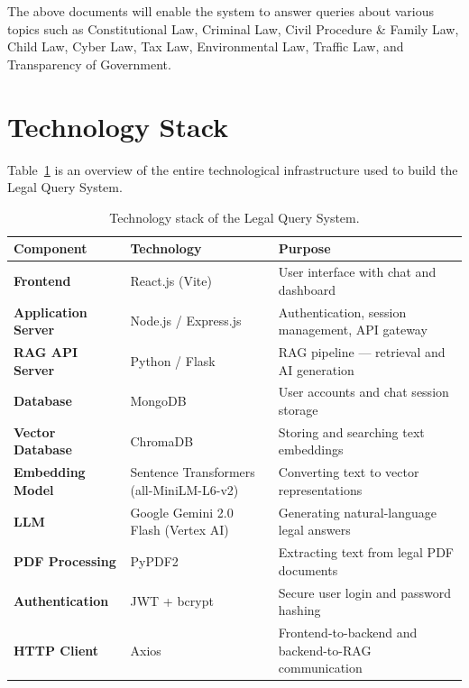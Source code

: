 \documentclass[12pt,a4paper]{article}
\begin{document}
The above documents will enable the system to answer queries about various topics such as Constitutional Law, Criminal Law, Civil Procedure \& Family Law, Child Law, Cyber Law, Tax Law, Environmental Law, Traffic Law, and Transparency of Government.

\section{Technology Stack}

Table~\ref{tab:tech-stack} is an overview of the entire technological infrastructure used to build the Legal Query System.

\begin{table}[H]
\centering
\begin{tabular}{>{\bfseries}p{3.5cm} p{5cm} p{5cm}}
\toprule
\textbf{Component} & \textbf{Technology} & \textbf{Purpose} \\
\midrule
Frontend            & React.js (Vite)                       & User interface with chat and dashboard \\
Application Server  & Node.js / Express.js                  & Authentication, session management, API gateway \\
RAG API Server      & Python / Flask                        & RAG pipeline --- retrieval and AI generation \\
Database            & MongoDB                               & User accounts and chat session storage \\
Vector Database     & ChromaDB                              & Storing and searching text embeddings \\
Embedding Model     & Sentence Transformers (all-MiniLM-L6-v2) & Converting text to vector representations \\
LLM                 & Google Gemini 2.0 Flash (Vertex AI)   & Generating natural-language legal answers \\
PDF Processing      & PyPDF2                                & Extracting text from legal PDF documents \\
Authentication      & JWT + bcrypt                          & Secure user login and password hashing \\
HTTP Client         & Axios                                 & Frontend-to-backend and backend-to-RAG communication \\
\bottomrule
\end{tabular}
\caption{Technology stack of the Legal Query System.}
\label{tab:tech-stack}
\end{table}
\end{document}
